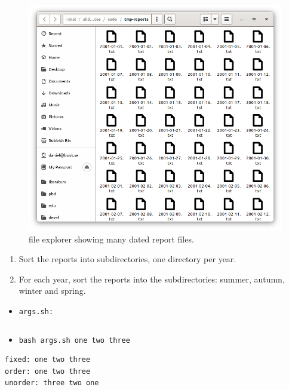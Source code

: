 \begin{frame}
  \begin{figure}
    \includegraphics[height=0.5\textheight]{fig/many-reports.png}
    \caption{file explorer showing many dated report files.}
  \end{figure}

  \begin{exercise}
    \begin{enumerate}
      \item Sort the reports into subdirectories, one directory per year.
      \item For each year, sort the reports into the subdirectories: summer, 
        autumn, winter and spring.
    \end{enumerate}
  \end{exercise}
\end{frame}

\begin{frame}[fragile]
  \begin{example}
    \begin{itemize}
      \item \texttt{args.sh:}
    \end{itemize}
    \inputminted[linenos,highlightlines={2,3}]{bash}{code/args.sh}
    \begin{itemize}
      \item \texttt{bash args.sh one two three}
    \end{itemize}
    \begin{verbatim}
fixed: one two three
order: one two three
unorder: three two one
    \end{verbatim}
  \end{example}
\end{frame}

